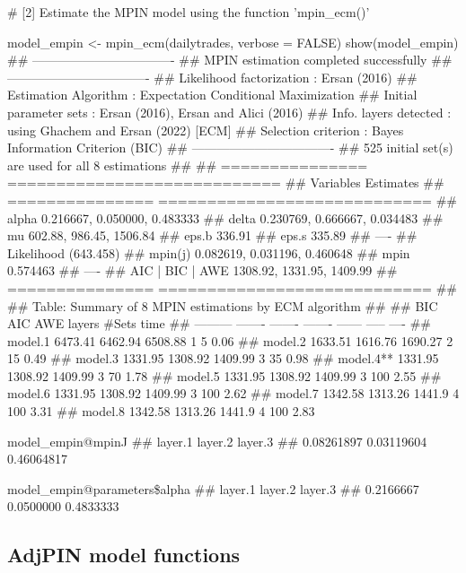 \begin{example}
# [2] Estimate the MPIN model using the function 'mpin_ecm()'

model_empin <- mpin_ecm(dailytrades, verbose = FALSE)
show(model_empin)
## ----------------------------------
## MPIN estimation completed successfully
## ----------------------------------
## Likelihood factorization : Ersan (2016)
## Estimation Algorithm     : Expectation Conditional Maximization
## Initial parameter sets   : Ersan (2016), Ersan and Alici (2016)
## Info. layers detected    : using Ghachem and Ersan (2022) [ECM]
## Selection criterion      : Bayes Information Criterion (BIC)
## ----------------------------------
## 525 initial set(s) are used for all 8 estimations
## 
## ===============  ============================
## Variables        Estimates                   
## ===============  ============================
## alpha            0.216667, 0.050000, 0.483333
## delta            0.230769, 0.666667, 0.034483
## mu               602.88, 986.45, 1506.84     
## eps.b            336.91                      
## eps.s            335.89                      
## ----                                         
## Likelihood       (643.458)                   
## mpin(j)          0.082619, 0.031196, 0.460648
## mpin             0.574463                    
## ----                                         
## AIC | BIC | AWE  1308.92, 1331.95, 1409.99   
## ===============  ============================
## 
## Table: Summary of 8 MPIN estimations by ECM algorithm
## 
##             BIC      AIC      AWE    layers  #Sets  time
## ---------  -------  -------  -------  ------  -----  ----
## model.1    6473.41  6462.94  6508.88    1         5  0.06
## model.2    1633.51  1616.76  1690.27    2        15  0.49
## model.3    1331.95  1308.92  1409.99    3        35  0.98
## model.4**  1331.95  1308.92  1409.99    3        70  1.78
## model.5    1331.95  1308.92  1409.99    3       100  2.55
## model.6    1331.95  1308.92  1409.99    3       100  2.62
## model.7    1342.58  1313.26  1441.9     4       100  3.31
## model.8    1342.58  1313.26  1441.9     4       100  2.83

model_empin@mpinJ
##    layer.1    layer.2    layer.3 
## 0.08261897 0.03119604 0.46064817 

model_empin@parameters\$alpha 
##   layer.1   layer.2   layer.3 
## 0.2166667 0.0500000 0.4833333 
\end{example}



\subsection{AdjPIN model functions}

